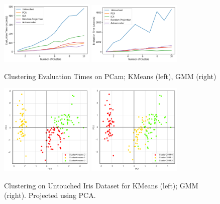 \documentclass[letter]{article}
\begin{document}
\begin{figure}
  \centering
  \includegraphics[width=0.4\textwidth]{images/kmeansTime.png}
  \includegraphics[width=0.4\textwidth]{images/gmmTime.png}
  \caption{Clustering Evaluation Times on PCam; KMeans (left), GMM (right)}
\end{figure}

\begin{figure}
  \centering
  \includegraphics[width=0.4\textwidth]{images/kmeansUntouchedIris.png}
  \includegraphics[width=0.4\textwidth]{images/gmmUntouchedIris.png}
  \caption{Clustering on Untouched Iris Dataset for KMeans (left); GMM (right). Projected using PCA.}
\end{figure}
\end{document}

